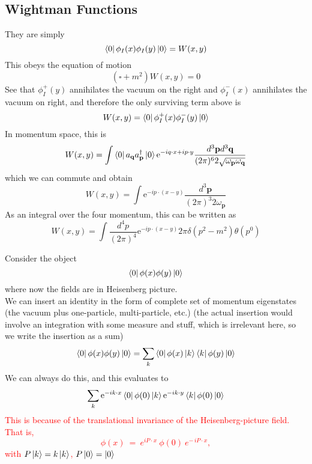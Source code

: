 \documentclass[11pt]{article}
\newcommand{\e}{\mathrm{e}}
\newcommand{\w}{\omega}
\renewcommand{\a}[1]{a_\mathbf{#1}}
\newcommand{\adag}[1]{a^\dagger_\mathbf{#1}}
\numberwithin{equation}{section}
\begin{document}
    \subsection{Wightman Functions}
    They are simply 
    \begin{equation*}
        \bra{0}\phi_I(x)\phi_I(y)\ket{0} = W(x,y)
    \end{equation*}
    This obeys the equation of motion 
    \begin{equation*}
        (\square + m^2) W(x,y) = 0
    \end{equation*}
    See that \(\phi_I^+(y)\) annihilates the vacuum on the right and \(\phi_I^-(x)\) annihilates the vacuum on right, and therefore the only surviving term above is 
    \begin{equation*}
        W(x,y) = \bra{0} \phi_I^+(x)\phi_I^-(y) \ket{0}
    \end{equation*}
    In momentum space, this is 
    \begin{equation*}
        W(x,y) = \int \bra{0} \a{q}\adag{p} \ket{0} \e^{-iq\cdot x + ip\cdot y} \frac{d^3\textbf{p} d^3\textbf{q}}{(2\pi)^6 2\sqrt{\w_\textbf{p} \w_\textbf{q}}}
    \end{equation*}
    which we can commute and obtain 
    \begin{equation*}
        W(x,y) = \int \e^{-ip\cdot (x - y)} \frac{d^3\textbf{p}}{(2\pi)^3 2\w_\textbf{p}}
    \end{equation*}
    As an integral over the four momentum, this can be written as 
    \begin{equation*}
        W(x,y) = \int \frac{d^4p}{(2\pi)^4} \e^{-ip\cdot (x-y)} 2\pi \delta(p^2 - m^2) \theta(p^0)
    \end{equation*}

    Consider the object 
    \begin{equation*}
        \bra{0} \phi(x)\phi(y) \ket{0}
    \end{equation*}
    where now the fields are in Heisenberg picture. \\
    We can insert an identity in the form of complete set of momentum eigenstates (the vacuum plus one-particle, multi-particle, etc.) (the actual insertion would involve an integration with some measure and stuff, which is irrelevant here, so we write the insertion as a sum)
    \begin{equation*}
        \bra{0} \phi(x)\phi(y) \ket{0} = \sum_k \bra{0} \phi(x) \ket{k}\bra{k}\phi(y) \ket{0}
    \end{equation*}
    We can always do this, and this evaluates to 
    \begin{equation*}
        \sum_k \e^{-ik\cdot x}  \bra{0} \phi(0) \ket{k} \e^{-ik\cdot y}   \bra{k}\phi(0) \ket{0}
    \end{equation*}
    \textcolor{red}{
        This is because of the translational invariance of the Heisenberg-picture field. That is, 
        \begin{equation*}
            \phi(x)~=~e^{i P\cdot x}\:\phi(0)\:e^{-\,i P\cdot x},
        \end{equation*}
        with \(P\ket{k} = k\ket{k}\), \(P\ket{0} = \ket{0}\)\\
    }
\end{document}
